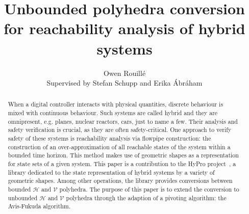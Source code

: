 \documentclass{llncs}
\begin{document}
\title{Unbounded polyhedra conversion for reachability analysis of hybrid systems}

\author{Owen Rouill\'e\\ Supervised by Stefan Schupp and Erika \'Abr\'aham}



\maketitle

\begin{abstract}
When a digital controller interacts with physical quantities, discrete behaviour is mixed with continuous behaviour. Such systems are called hybrid and they are omnipresent, e.g. planes, nuclear reactors, cars, just to name a few. Their analysis and safety verification is crucial, as they are often safety-critical. One approach to verify safety of these systems is reachability analysis via flowpipe construction: the construction of an over-approximation of all reachable states of the system within a bounded time horizon. This method makes use of geometric shapes as a representation for state sets of a given system. This paper is a contribution to the HyPro project~\cite{hypro}, a library dedicated to the state representation of hybrid systems by a variety of geometric shapes. Among other operations, the library provides conversions between bounded $\mathcal{H}$ and $\mathcal{V}$ polyhedra. The purpose of this paper is to extend the conversion to unbounded $\mathcal{H}$ and $\mathcal{V}$ polyhedra through the adaption of a pivoting algorithm: the Avis-Fukuda algorithm.
\end{abstract}









\printbibliography
\end{document}
